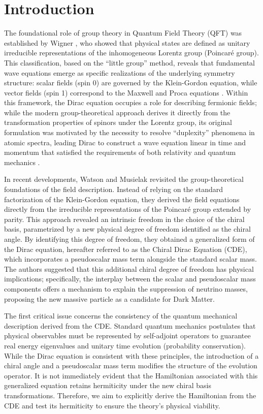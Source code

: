\section{Introduction}

The foundational role of group theory in Quantum Field Theory (QFT) was
established by Wigner \cite{Wigner1939}, who showed that physical states are
defined as unitary irreducible representations of the inhomogeneous Lorentz
group (Poincar\'{e} group). This classification, based on the ``little group''
method, reveals that fundamental wave equations emerge as specific realizations
of the underlying symmetry structure: scalar fields (spin 0) are governed by the
Klein-Gordon equation, while vector fields (spin 1) correspond to the Maxwell
and Proca equations \cite{ryderQuantumFieldTheory1996}. Within this framework, the Dirac equation
occupies a role for describing fermionic fields; while the modern
group-theoretical approach derives it directly from the transformation
properties of spinors under the Lorentz group, its original formulation was
motivated by the necessity to resolve ``duplexity'' phenomena in atomic spectra,
leading Dirac to construct a wave equation linear in time and momentum that
satisfied the requirements of both relativity and quantum mechanics
\cite{diracQuantumTheoryElectron1928}.

In recent developments, Watson and Musielak \cite{watsonChiralSymmetryDirac2020,
watsonChiralDiracEquation2021, Watson2022} revisited the
group-theoretical foundations of the field description. Instead of relying on
the standard factorization of the Klein-Gordon equation, they derived the field
equations directly from the irreducible representations of the Poincar\'{e}
group extended by parity. This approach revealed an intrinsic freedom in the
choice of the chiral basis, parametrized by a new physical degree of freedom
identified as the chiral angle. By identifying this degree of freedom, they
obtained a generalized form of the Dirac equation, hereafter referred to as the
Chiral Dirac Equation (CDE), which incorporates a pseudoscalar mass term
alongside the standard scalar mass. The authors suggested that this additional
chiral degree of freedom has physical implications; specifically, the interplay
between the scalar and pseudoscalar mass components offers a mechanism to
explain the suppression of neutrino masses, proposing the new massive particle
as a candidate for Dark Matter.

The first critical issue concerns the consistency of the quantum mechanical
description derived from the CDE. Standard quantum mechanics postulates that
physical observables must be represented by self-adjoint operators to guarantee
real energy eigenvalues and unitary time evolution (probability conservation).
While the Dirac equation is consistent with these principles, the introduction
of a chiral angle and a pseudoscalar mass term modifies the structure of the
evolution operator. It is not immediately evident that the Hamiltonian
associated with this generalized equation retains hermiticity under the new
chiral basis transformations. Therefore, we aim to explicitly derive the
Hamiltonian from the CDE and test its hermiticity to ensure the theory's
physical viability.

